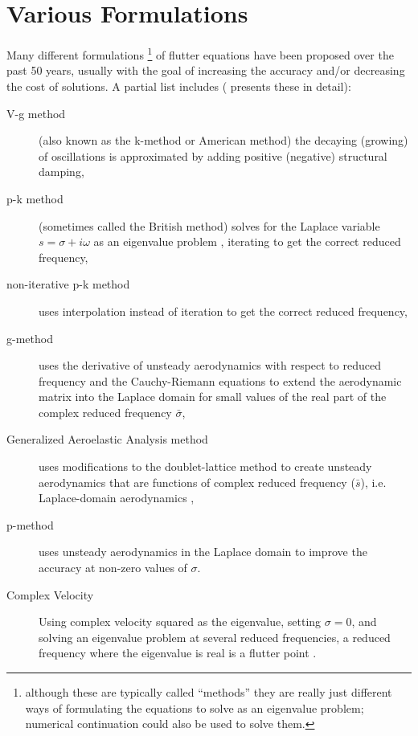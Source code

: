 \documentclass[10pt,openany,twoside]{book}
\numberwithin{equation}{section}   %
\begin{document}
\section{Various Formulations}\label{sect:formulations}
Many different formulations
\footnote{although these are typically called ``methods'' they are really
	just different ways of formulating the equations to solve as an
	eigenvalue problem; numerical continuation could also be used to solve them.}
of flutter equations have been proposed
over the past 50 years, usually with the goal of increasing the accuracy
and/or decreasing the cost of solutions. A partial list includes
(\cite{demasi2024introduction} presents these in detail):
\begin{description}
	\item[V-g method] (also known as the k-method or American method)
		\cite{hassig1971approximate} the decaying (growing)
		of oscillations is approximated by adding positive (negative) structural
		damping, 
	\item[p-k method] (sometimes called the British method) solves for
		the Laplace variable $s = \sigma + i\omega$ as an eigenvalue problem
		\cite{hassig1971approximate}, iterating to get the correct reduced frequency,
	\item[non-iterative p-k method]\cite{pitt1999new} uses interpolation instead of
		iteration to get the correct reduced frequency,
	\item[g-method]  uses the derivative of unsteady aerodynamics with respect to
			reduced frequency and the Cauchy-Riemann equations to extend the
			aerodynamic matrix into the Laplace domain for small values of the real
			part of the complex reduced frequency $\bar{\sigma}$\cite{chen2000damping},
	\item[Generalized Aeroelastic Analysis method] uses modifications to the
			doublet-lattice method to create unsteady aerodynamics that are functions
			of complex reduced frequency ($\bar{s}$), i.e. Laplace-domain aerodynamics
			\cite{edwards2008flutter},
	\item[p-method] uses unsteady aerodynamics in the Laplace domain
			to improve the accuracy at non-zero values of $\sigma$.
			\cite{haddadpour2009true}
	\item[Complex Velocity] Using complex velocity squared as the eigenvalue,
		setting $\sigma=0$, and solving an eigenvalue problem at several
		reduced frequencies, a reduced frequency where the eigenvalue is
		real is a flutter point \cite{pitt2000complex}.
\end{description}
\end{document}
